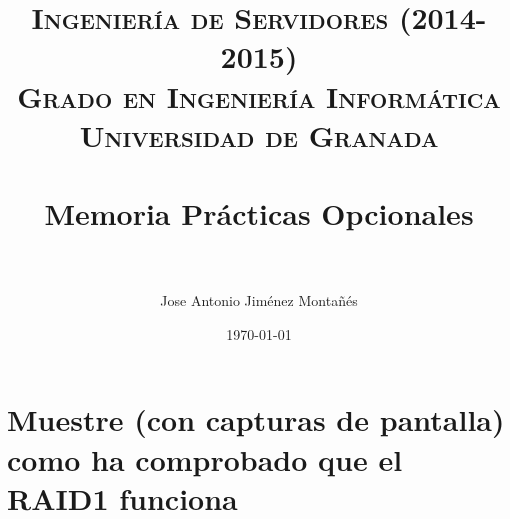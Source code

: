 

\usepackage[pdftex,colorlinks=true,linkcolor=negro,urlcolor=blue]{hyperref,xcolor}

\graphicspath{ {./imagenes/} }
\usepackage{subfig}
\hypersetup{citecolor=blue}

\title{	
\normalfont \normalsize 
\textsc{{\bf Ingeniería de Servidores (2014-2015)} \\ Grado en Ingeniería Informática \\ Universidad de Granada} \\ [25pt]
\horrule{0.5pt} \\[0.4cm] %
\huge Memoria Prácticas Opcionales \\ %
\horrule{2pt} \\[0.5cm] %
}

\author{Jose Antonio Jiménez Montañés}

\date{\normalsize\today}

%






\maketitle %

\newpage %

\tableofcontents %
\clearpage
\listoffigures


\newpage

\section{Muestre (con capturas de pantalla) como ha comprobado que el RAID1 funciona}

